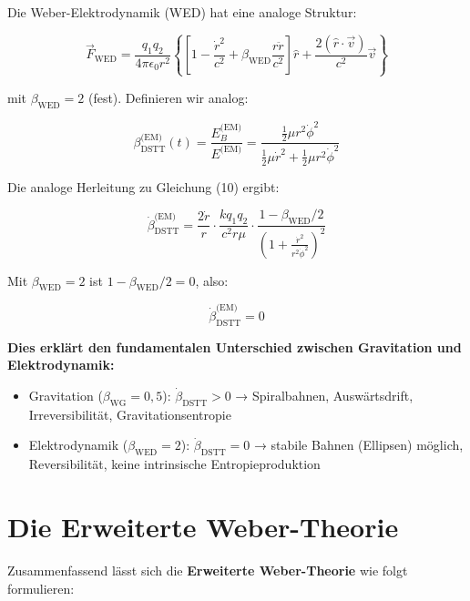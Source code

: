 \documentclass[12pt,a4paper]{article}
\begin{document}
Die Weber-Elektrodynamik (WED) hat eine analoge Struktur:

\begin{equation}
\vec{F}_{\text{WED}} = \frac{q_1 q_2}{4\pi\epsilon_0 r^2} \left\{ \left[1 - \frac{\dot{r}^2}{c^2} + \beta_{\text{WED}}\frac{r\ddot{r}}{c^2}\right] \hat{r} + \frac{2(\hat{r}\cdot\vec{v})}{c^2}\vec{v} \right\}
\end{equation}

mit \(\beta_{\text{WED}} = 2\) (fest). Definieren wir analog:

\begin{equation}
\beta_{\text{DSTT}}^{\text{(EM)}}(t) = \frac{E_B^{\text{(EM)}}}{E^{\text{(EM)}}} = \frac{\frac{1}{2}\mu r^2\dot{\phi}^2}{\frac{1}{2}\mu\dot{r}^2 + \frac{1}{2}\mu r^2\dot{\phi}^2}
\end{equation}

Die analoge Herleitung zu Gleichung (10) ergibt:

\begin{equation}
\dot{\beta}_{\text{DSTT}}^{\text{(EM)}} = \frac{2\dot{r}}{r} \cdot \frac{k q_1 q_2}{c^2 r \mu} \cdot \frac{1 - \beta_{\text{WED}}/2}{\left(1 + \frac{\dot{r}^2}{r^2\dot{\phi}^2}\right)^2}
\end{equation}

Mit \(\beta_{\text{WED}} = 2\) ist \(1 - \beta_{\text{WED}}/2 = 0\), also:

\begin{equation}
\dot{\beta}_{\text{DSTT}}^{\text{(EM)}} = 0
\end{equation}

\textbf{Dies erklärt den fundamentalen Unterschied zwischen Gravitation und Elektrodynamik:}

\begin{itemize}
    \item Gravitation (\(\beta_{\text{WG}} = 0,5\)): \(\dot{\beta}_{\text{DSTT}} > 0\) → Spiralbahnen, Auswärtsdrift, Irreversibilität, Gravitationsentropie
    \item Elektrodynamik (\(\beta_{\text{WED}} = 2\)): \(\dot{\beta}_{\text{DSTT}} = 0\) → stabile Bahnen (Ellipsen) möglich, Reversibilität, keine intrinsische Entropieproduktion
\end{itemize}

\section{Die Erweiterte Weber-Theorie}

Zusammenfassend lässt sich die \textbf{Erweiterte Weber-Theorie} wie folgt formulieren:
\end{document}
